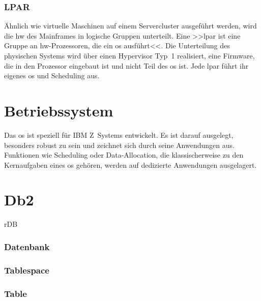 \subsubsection{LPAR}

Ähnlich wie virtuelle Maschinen auf einem Servercluster ausgeführt werden, wird die \ac{hw} des Mainframes in logische Gruppen unterteilt. Eine >>\ac{lpar} ist eine Gruppe an \ac{hw}-Prozessoren, die ein \ac{os} ausführt<<\cite{redbook.1}. Die Unterteilung des physischen Systems wird über einen Hypervisor Typ~1 realisiert, eine Firmware, die in den Prozessor eingebaut ist und nicht Teil des \ac{os} ist. Jede \ac{lpar} führt ihr eigenes \ac{os} und Scheduling aus.


\section[\z]{Betriebssystem \z}
Das \ac{os} \emph{\z} ist speziell für IBM Z~Systems entwickelt. Es ist darauf ausgelegt, besonders robust zu sein und zeichnet sich durch seine Anwendungen aus. Funktionen wie Scheduling oder Data-Allocation, die klassischerweise zu den Kernaufgaben eines \ac{os} gehören, werden auf dedizierte Anwendungen ausgelagert.



\section{Db2}
rDB

\subsubsection[\ac{db}]{Datenbank}

\subsubsection[\ac{ts}]{Tablespace}

\subsubsection[\ac{tb}]{Table}
